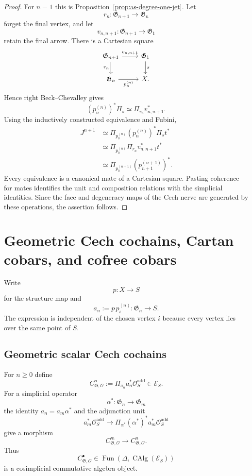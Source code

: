\begin{proof}
For $n=1$ this is Proposition~\ref{prop:as-degree-one-jet}.  Let
\[
    r_n:\mathfrak G_{n+1}\longrightarrow\mathfrak G_n
\]
forget the final vertex, and let
\[
    v_{n,n+1}:\mathfrak G_{n+1}\longrightarrow\mathfrak G_1
\]
retain the final arrow.  There is a Cartesian square
\[
\begin{tikzcd}
\mathfrak G_{n+1}
  \arrow[r,"v_{n,n+1}"]
  \arrow[d,"r_n"'] &
\mathfrak G_1
  \arrow[d,"s"]\\
\mathfrak G_n
  \arrow[r,"p_n^{(n)}"'] &
X.
\end{tikzcd}
\]
Hence right Beck--Chevalley gives
\[
    (p_n^{(n)})^*\Pi_s
    \simeq
    \Pi_{r_n}v_{n,n+1}^*.
\]
Using the inductively constructed equivalence and Fubini,
\[
\begin{aligned}
J^{n+1}
&\simeq
\Pi_{p_0^{(n)}}(p_n^{(n)})^*\Pi_s t^*\\
&\simeq
\Pi_{p_0^{(n)}}\Pi_{r_n}
v_{n,n+1}^*t^*\\
&\simeq
\Pi_{p_0^{(n+1)}}
(p_{n+1}^{(n+1)})^*.
\end{aligned}
\]
Every equivalence is a canonical mate of a Cartesian square.  Pasting
coherence for mates identifies the unit and composition relations with the
simplicial identities.  Since the face and degeneracy maps of the Cech nerve
are generated by these operations, the assertion follows.
\end{proof}


\section{Geometric Cech cochains, Cartan cobars, and cofree cobars}
\label{sec:as-cobar}

Write
\[
    p:X\longrightarrow S
\]
for the structure map and
\[
    a_n:=p\,p_i^{(n)}:\mathfrak G_n\longrightarrow S.
\]
The expression is independent of the chosen vertex $i$ because every vertex
lies over the same point of $S$.

\subsection{Geometric scalar Cech cochains}

\begin{definition}
\label{def:as-geometric-cech}
For $n\geq0$ define
\[
\boxed{
    C_{\mathfrak G,\mathcal O}^{n}
    :=
    \Pi_{a_n}a_n^*\mathcal O_S^{\mathrm{add}}
    \in\mathcal E_S.
}
\]
For a simplicial operator
\[
    \alpha^*:\mathfrak G_n\longrightarrow\mathfrak G_m
\]
the identity $a_n=a_m\alpha^*$ and the adjunction unit
\[
    a_m^*\mathcal O_S^{\mathrm{add}}
    \longrightarrow
    \Pi_{\alpha^*}(\alpha^*)^*
    a_m^*\mathcal O_S^{\mathrm{add}}
\]
give a morphism
\[
    C_{\mathfrak G,\mathcal O}^{m}
    \longrightarrow
    C_{\mathfrak G,\mathcal O}^{n}.
\]
Thus
\[
    C_{\mathfrak G,\mathcal O}^{\bullet}
    \in
    \operatorname{Fun}
    \left(
        \Delta,
        \operatorname{CAlg}(\mathcal E_S)
    \right)
\]
is a cosimplicial commutative algebra object.
\end{definition}


